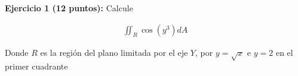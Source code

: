 \documentclass[a4paper]{article}
\begin{document}
\setlength{\parindent}{0cm}

\textbf{Ejercicio 1 (12 puntos):} Calcule

\begin{align*}
    \iint_R \cos(y^3)dA
\end{align*}

Donde $R$ es la región del plano limitada por el eje $Y$, por $y=\sqrt{x}$ e $y=2$ en el primer cuadrante
\end{document}
